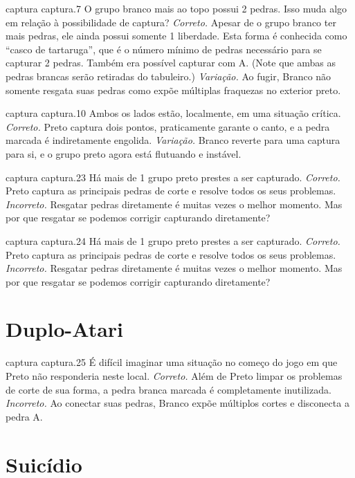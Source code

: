 \problemAnswerDiagram
  {captura}
  {captura.7}
  {O grupo branco mais ao topo possui 2 pedras. Isso muda algo em relação à possibilidade de captura?}
  {\emph{Correto.} Apesar de o grupo branco ter mais pedras, ele ainda possui somente 1 liberdade. Esta forma é conhecida como ``casco de tartaruga'', que é o número mínimo de pedras necessário para se capturar 2 pedras. Também era possível capturar com A. (Note que ambas as pedras brancas serão retiradas do tabuleiro.)}
  {\emph{Variação.} Ao fugir, Branco não somente resgata suas pedras como expõe múltiplas fraquezas no exterior preto.}

\problemAnswerDiagram
  {captura}
  {captura.10}
  {Ambos os lados estão, localmente, em uma situação crítica.}
  {\emph{Correto.} Preto captura dois pontos, praticamente garante o canto, e a pedra marcada é indiretamente engolida.}
  {\emph{Variação.} Branco reverte para uma captura para si, e o grupo preto agora está flutuando e instável.}

\problemAnswerDiagram
  {captura}
  {captura.23}
  {Há mais de 1 grupo preto prestes a ser capturado.}
  {\emph{Correto.} Preto captura as principais pedras de corte e resolve todos os seus problemas.}
  {\emph{Incorreto.} Resgatar pedras diretamente é muitas vezes o melhor momento. Mas por que resgatar se podemos corrigir capturando diretamente?}

\problemAnswerDiagram
  {captura}
  {captura.24}
  {Há mais de 1 grupo preto prestes a ser capturado.}
  {\emph{Correto.} Preto captura as principais pedras de corte e resolve todos os seus problemas.}
  {\emph{Incorreto.} Resgatar pedras diretamente é muitas vezes o melhor momento. Mas por que resgatar se podemos corrigir capturando diretamente?}

\chapter{Duplo-Atari}

\emptypage

\problemAnswerDiagram
  {captura}
  {captura.25}
  {É difícil imaginar uma situação no começo do jogo em que Preto não responderia neste local.}
  {\emph{Correto.} Além de Preto limpar os problemas de corte de sua forma, a pedra branca marcada é completamente inutilizada.}
  {\emph{Incorreto.} Ao conectar suas pedras, Branco expõe múltiplos cortes e disconecta a pedra A.}

\chapter{Suicídio}

